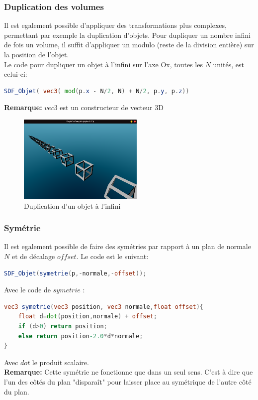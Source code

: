\subsubsection{Duplication des volumes}
Il est egalement possible d'appliquer des transformations plus complexes, permettant par exemple la duplication d'objets. Pour dupliquer un nombre infini de fois un volume, il suffit d'appliquer un modulo (reste de la division entière) sur la position de l'objet.
\\Le code pour dupliquer un objet à l'infini sur l'axe Ox, toutes les $N$ unités, est celui-ci:
\begin{lstlisting}[language=GLSL]
SDF_Objet( vec3( mod(p.x - N/2, N) + N/2, p.y, p.z))
\end{lstlisting}
\textbf{Remarque:} $vec3$ est un constructeur de vecteur 3D
\begin{figure}[h]
    \centering
    \includegraphics[width=6cm]{images/screens/infinite.png}
    \caption{Duplication d'un objet à l'infini}
    \label{fig:infinite}
\end{figure}

\subsubsection{Symétrie}
Il est egalement possible de faire des symétries par rapport à un plan de normale $N$ et de décalage $offset$. Le code est le suivant:
\begin{lstlisting}[language=GLSL]
SDF_Objet(symetrie(p,-normale,-offset));
\end{lstlisting}
Avec le code de $symetrie$ :
\begin{lstlisting}[language=GLSL]
vec3 symetrie(vec3 position, vec3 normale,float offset){
    float d=dot(position,normale) + offset;
    if (d>0) return position;
    else return position-2.0*d*normale;
}
\end{lstlisting}
Avec $dot$ le produit scalaire.
\\\textbf{Remarque:} Cette symétrie ne fonctionne que dans un seul sens. C'est à dire que l'un des côtés du plan "disparaît" pour laisser place au symétrique de l'autre côté du plan.